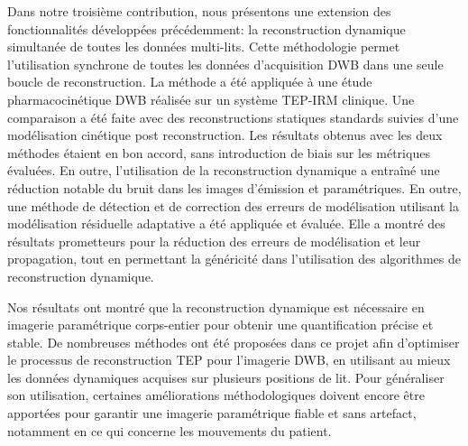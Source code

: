 Dans notre troisième contribution, nous présentons une extension des fonctionnalités développées précédemment: la reconstruction dynamique simultanée de toutes les données multi-lits. Cette méthodologie permet l'utilisation synchrone de toutes les données d'acquisition DWB dans une seule boucle de reconstruction. La méthode a été appliquée à une étude pharmacocinétique DWB réalisée sur un système TEP-IRM clinique. Une comparaison a été faite avec des reconstructions statiques standards suivies d'une modélisation cinétique post reconstruction. Les résultats obtenus avec les deux méthodes étaient en bon accord, sans introduction de biais sur les métriques évaluées. En outre, l'utilisation de la reconstruction dynamique a entraîné une réduction notable du bruit dans les images d’émission et paramétriques. En outre, une méthode de détection et de correction des erreurs de modélisation utilisant la modélisation résiduelle adaptative a été appliquée et évaluée. Elle a montré des résultats prometteurs pour la réduction des erreurs de modélisation et leur propagation, tout en permettant la généricité dans l'utilisation des algorithmes de reconstruction dynamique.

Nos résultats ont montré que la reconstruction dynamique est nécessaire en imagerie paramétrique corps-entier pour obtenir une quantification précise et stable. De nombreuses méthodes ont été proposées dans ce projet afin d’optimiser le processus de reconstruction TEP pour l'imagerie DWB, en utilisant au mieux les données dynamiques acquises sur plusieurs positions de lit. Pour généraliser son utilisation, certaines améliorations méthodologiques doivent encore être apportées pour garantir une imagerie paramétrique fiable et sans artefact, notamment en ce qui concerne les mouvements du patient.
